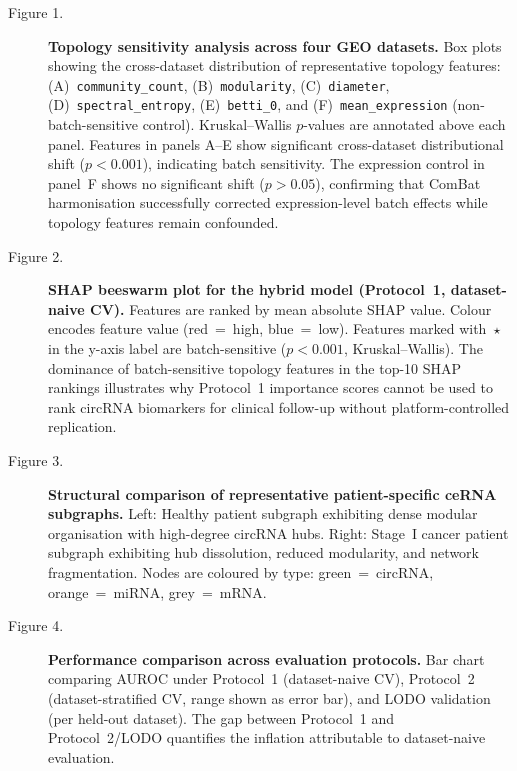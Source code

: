 \documentclass[12pt]{article}
\begin{document}
\begin{description}

\item[Figure 1.] \textbf{Topology sensitivity analysis across four GEO
datasets.} Box plots showing the cross-dataset distribution of
representative topology features: (A)~\texttt{community\_count},
(B)~\texttt{modularity}, (C)~\texttt{diameter},
(D)~\texttt{spectral\_entropy}, (E)~\texttt{betti\_0}, and
(F)~\texttt{mean\_expression} (non-batch-sensitive control). Kruskal--Wallis
$p$-values are annotated above each panel. Features in panels A--E show
significant cross-dataset distributional shift ($p < 0.001$), indicating
batch sensitivity. The expression control in panel~F shows no significant
shift ($p > 0.05$), confirming that ComBat harmonisation successfully
corrected expression-level batch effects while topology features
remain confounded.

\item[Figure 2.] \textbf{SHAP beeswarm plot for the hybrid model
(Protocol~1, dataset-naive CV).} Features are ranked by mean absolute
SHAP value. Colour encodes feature value (red~=~high, blue~=~low).
Features marked with~$\star$ in the y-axis label are batch-sensitive
($p < 0.001$, Kruskal--Wallis). The dominance of batch-sensitive topology
features in the top-10 SHAP rankings illustrates why Protocol~1
importance scores cannot be used to rank circRNA biomarkers for clinical
follow-up without platform-controlled replication.

\item[Figure 3.] \textbf{Structural comparison of representative
patient-specific ceRNA subgraphs.} Left: Healthy patient subgraph
exhibiting dense modular organisation with high-degree circRNA hubs.
Right: Stage~I cancer patient subgraph exhibiting hub dissolution,
reduced modularity, and network fragmentation. Nodes are coloured by
type: green~=~circRNA, orange~=~miRNA, grey~=~mRNA.

\item[Figure 4.] \textbf{Performance comparison across evaluation
protocols.} Bar chart comparing AUROC under Protocol~1 (dataset-naive
CV), Protocol~2 (dataset-stratified CV, range shown as error bar), and
LODO validation (per held-out dataset). The gap between Protocol~1 and
Protocol~2/LODO quantifies the inflation attributable to dataset-naive
evaluation.

\end{description}
\end{document}
